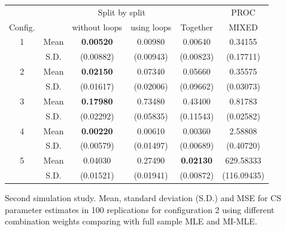 \documentclass[11pt,a5paper,twoside]{book}
\begin{document}
{\begin{table}[ht]
\def\arraystretch{0.6} \begin{tabular}{cccccc}
  \hline\hline
&&\multicolumn{2}{c}{Split by split} & & PROC \\ 
\cline{3-4}
Config.& & without loops &  using loops & Together & MIXED \\ 
  \hline
1& Mean & \textbf{0.00520} & 0.00980 & 0.00640 & 0.34155 \\ 
 & S.D. & (0.00882) & (0.00943) & (0.00823) & (0.17711) \\ 
2  &Mean & \textbf{0.02150} & 0.07340 & 0.05660 & 0.35575 \\ 
  &S.D. & (0.01617) & (0.02006) & (0.09662) & (0.03073) \\ 
3  &Mean & \textbf{0.17980} & 0.73480 & 0.43400 & 0.81783 \\ 
  &S.D. & (0.02292) & (0.05835) & (0.11543) & (0.02582) \\ 
4  &Mean & \textbf{0.00220} & 0.00610 & 0.00360 & 2.58808 \\ 
  &S.D. & (0.00579) & (0.01497) & (0.00689) & (0.40720) \\ 
5  &Mean & 0.04030 & 0.27490 &\textbf{ 0.02130} & 629.58333 \\ 
  &S.D. & (0.01521) & (0.01941) & (0.00872) & (116.09435) \\ 
\hline\hline
\end{tabular}
\end{table}



\begin{table}[ht]
\centering
\caption{\small \linespread{1.1} Second simulation study. Mean, standard deviation (S.D.) and MSE for CS parameter estimates in 100 replications for configuration 2 using different combination weights comparing with full sample MLE and MI-MLE.}
\label{tab_mi_est}

\vspace*{2mm}


\end{table}}
\end{document}
